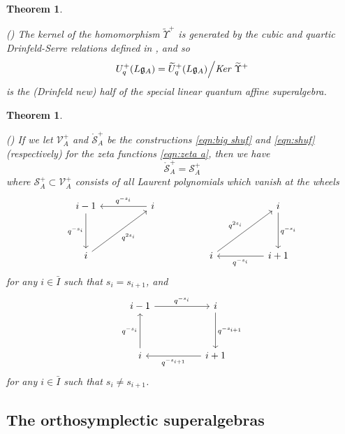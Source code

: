 \documentclass{amsart}
\newtheorem{theorem}[subsection]{Theorem}
\def\fg{{\mathfrak{g}}}
\def\CS{{\mathcal{S}}}
\def\CV{{\mathcal{V}}}
\def\tua{\widetilde{U}_q^+(L\fg_A)}
\def\ua{U_q^+(L\fg_A)}
\def\oCS{\mathring{\CS}}
\begin{document}
\medskip 

\begin{theorem}
\label{thm:a 1}

(\cite{NT}) The kernel of the homomorphism $\widetilde{\Upsilon}^+$ is generated by the cubic and quartic Drinfeld-Serre relations defined in \cite{Y2}, and so
\[
\ua = \tua \Big/ \emph{Ker } \widetilde{\Upsilon}^+
\]
is the (Drinfeld new) half of the special linear quantum affine superalgebra. 

\end{theorem}

\medskip 

\begin{theorem}
\label{thm:a 2}

(\cite{T}) If we let $\CV^+_A$ and $\oCS^+_A$ be the constructions \eqref{eqn:big shuf} and \eqref{eqn:shuf} (respectively) for the zeta functions \eqref{eqn:zeta a}, then we have
\[
\oCS^+_A = \CS^+_A
\]
where $\CS^+_A \subset \CV^+_A$ consists of all Laurent polynomials which vanish at the wheels
\begin{equation}
\label{eqn:wheel finite even}
\begin{tikzcd}
i-1 && i &&&& i \\ \\
i &&&& i && i+1
\arrow["{q^{-s_{i}}}"', from=1-1, to=3-1]
\arrow["{q^{-s_i}}"', from=1-3, to=1-1]
\arrow["{q^{-s_{i}}}", from=1-7, to=3-7]
\arrow["{q^{2s_i}}"', from=3-1, to=1-3]
\arrow["{q^{2s_i}}", from=3-5, to=1-7]
\arrow["{q^{-s_i}}", from=3-7, to=3-5]
\end{tikzcd}
\end{equation}
for any $i \in \bar{I}$ such that $s_i = s_{i+1}$, and
\begin{equation}
\label{eqn:wheel finite odd}
\begin{tikzcd}
i-1 && i \\ \\
i && i+1
\arrow["{q^{-s_i}}", from=1-1, to=1-3]
\arrow["{q^{-s_{i+1}}}", from=1-3, to=3-3]
\arrow["{q^{-s_i}}", from=3-1, to=1-1]
\arrow["{q^{-s_{i+1}}}", from=3-3, to=3-1]
\end{tikzcd}
\end{equation}
for any $i \in \bar{I}$ such that $s_i \neq s_{i+1}$.

\end{theorem}

\medskip 

\subsection{The orthosymplectic superalgebras}
\label{sub:osp}
\end{document}

